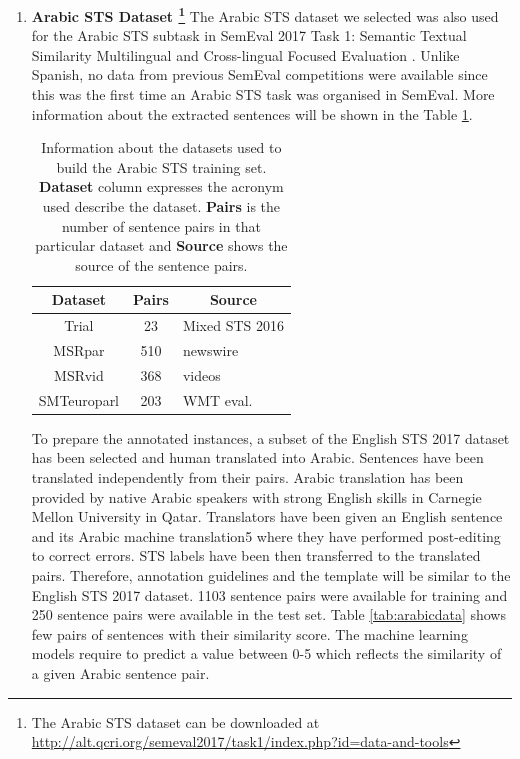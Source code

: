 \begin{enumerate}
\item{ \textbf{Arabic STS Dataset \footnote{The Arabic STS dataset can be downloaded at \url{http://alt.qcri.org/semeval2017/task1/index.php?id=data-and-tools}}}} The Arabic STS dataset we selected was also used for the Arabic STS subtask in SemEval 2017 Task 1: Semantic Textual Similarity Multilingual and Cross-lingual Focused Evaluation \cite{cer-etal-2017-semeval}. Unlike Spanish, no data from previous SemEval competitions were available since this was the first time an Arabic STS task was organised in SemEval. More information about the extracted sentences will be shown in the Table \ref{tab:arabicdata_info}. 

\begin{table}[ht!]
	\centering
	\begin{tabular}{c|c|l}
		\hline
		\multicolumn{1}{c|}{\textbf{Dataset}} & 
		\multicolumn{1}{c|}{\textbf{Pairs}} & 
		\multicolumn{1}{c}{\textbf{Source}} \\
		\hline
		Trial & 23 & Mixed STS 2016 \\
		MSRpar  & 510 & newswire \\
		MSRvid  & 368 & videos \\
		SMTeuroparl  & 203 & WMT eval. \\
		\hline
	\end{tabular}
	\caption[Information about Arabic STS training set]{Information about the datasets used to build the Arabic STS training set. \textbf{Dataset} column expresses the acronym used describe the dataset. \textbf{Pairs} is the number of sentence pairs in that particular dataset and \textbf{Source} shows the source of the sentence pairs. }
	\label{tab:arabicdata_info}
\end{table}  

To prepare the annotated instances, a subset of the English STS 2017 dataset has been selected and human translated into Arabic. Sentences have been translated independently from their pairs. Arabic translation has been provided by native Arabic speakers with strong English skills in Carnegie Mellon University in Qatar. Translators have been given an English sentence and its Arabic machine translation5 where they have performed post-editing to correct errors. STS labels have been then transferred to the translated pairs. Therefore, annotation guidelines and the template will be similar to the English STS 2017 dataset. 1103 sentence pairs were available for training and 250 sentence pairs were available in the test set. Table \ref{tab:arabicdata} shows few pairs of sentences with their similarity score. The machine learning models require to predict a value between 0-5 which reflects the similarity of a given Arabic sentence pair. 


\end{enumerate}
